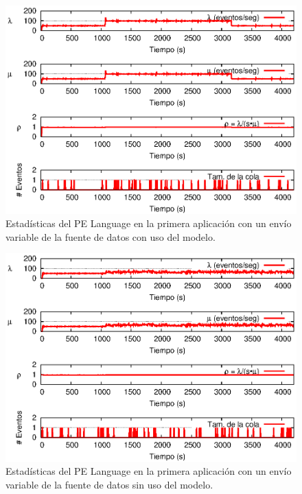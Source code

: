 \begin{figure}[!ht]
\centering
    \includegraphics[scale=1.1]{images/exp/app1/normal/cm/statusLanguagePE.eps}
    \caption{Estad\'isticas del PE Language en la primera aplicaci\'on con un env\'io variable de la fuente de datos con uso del modelo.}
    \label{fig:app1-normal-statusLanguagePE-cm}
\end{figure}

\begin{figure}[!ht]
\centering
    \includegraphics[scale=1.1]{images/exp/app1/normal/sm/statusLanguagePE.eps}
    \caption{Estad\'isticas del PE Language en la primera aplicaci\'on con un env\'io variable de la fuente de datos sin uso del modelo.}
    \label{fig:app1-normal-statusLanguagePE-sm}
\end{figure}

